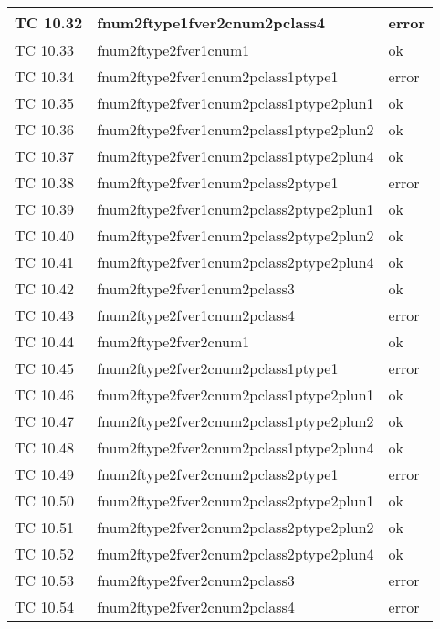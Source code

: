 \begin{longtable}{|p{3cm}|p{7cm}|p{3cm}|}
	\hline
	TC 10.32			& fnum2ftype1fver2cnum2pclass4			& error \tabularnewline
	\hline
	TC 10.33			& fnum2ftype2fver1cnum1				& ok \tabularnewline
	\hline
	TC 10.34			& fnum2ftype2fver1cnum2pclass1ptype1		& error \tabularnewline
	\hline
	TC 10.35			& fnum2ftype2fver1cnum2pclass1ptype2plun1	& ok \tabularnewline
	\hline
	TC 10.36			& fnum2ftype2fver1cnum2pclass1ptype2plun2	& ok \tabularnewline
	\hline
	TC 10.37			& fnum2ftype2fver1cnum2pclass1ptype2plun4	& ok \tabularnewline
	\hline
	TC 10.38			& fnum2ftype2fver1cnum2pclass2ptype1		& error \tabularnewline
	\hline
	TC 10.39			& fnum2ftype2fver1cnum2pclass2ptype2plun1	& ok \tabularnewline
	\hline
	TC 10.40			& fnum2ftype2fver1cnum2pclass2ptype2plun2	& ok \tabularnewline
	\hline
	TC 10.41			& fnum2ftype2fver1cnum2pclass2ptype2plun4	& ok \tabularnewline
	\hline
	TC 10.42			& fnum2ftype2fver1cnum2pclass3			& ok \tabularnewline
	\hline
	TC 10.43			& fnum2ftype2fver1cnum2pclass4			& error \tabularnewline
	\hline
	TC 10.44			& fnum2ftype2fver2cnum1				& ok \tabularnewline
	\hline
	TC 10.45			& fnum2ftype2fver2cnum2pclass1ptype1		& error \tabularnewline
	\hline
	TC 10.46			& fnum2ftype2fver2cnum2pclass1ptype2plun1	& ok \tabularnewline
	\hline
	TC 10.47			& fnum2ftype2fver2cnum2pclass1ptype2plun2	& ok \tabularnewline
	\hline
	TC 10.48			& fnum2ftype2fver2cnum2pclass1ptype2plun4	& ok \tabularnewline
	\hline
	TC 10.49			& fnum2ftype2fver2cnum2pclass2ptype1		& error \tabularnewline
	\hline
	TC 10.50			& fnum2ftype2fver2cnum2pclass2ptype2plun1	& ok \tabularnewline
	\hline
	TC 10.51			& fnum2ftype2fver2cnum2pclass2ptype2plun2	& ok \tabularnewline
	\hline
	TC 10.52			& fnum2ftype2fver2cnum2pclass2ptype2plun4	& ok \tabularnewline
	\hline
	TC 10.53			& fnum2ftype2fver2cnum2pclass3			& error \tabularnewline
	\hline
	TC 10.54			& fnum2ftype2fver2cnum2pclass4			& error \tabularnewline
	\hline
\end{longtable}
